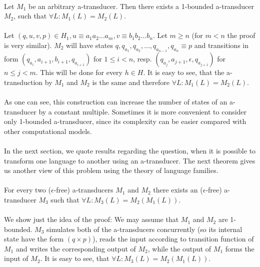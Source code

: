 \paragraph{}
\clema Let $M_{1}$ be an arbitrary a-transducer. Then there exists a 1-bounded a-transducer $M_{2}$, such that $\forall L: M_{1}(L) = M_{2}(L)$.

\paragraph{}
\dokaz Let $(q, u, v, p) \in H_{1}, u \equiv a_{1}a_{2}...a_{m}, v \equiv b_{1}b_{2}...b_{n}$. Let $m\geq n$ (for $m < n$ the proof is very similar). $M_{2}$ will have states $q, q_{a_{1}}, q_{a_{2}}, ..., q_{a_{n-1}}, q_{a_{n}} \equiv p$ and transitions in form $(q_{a_{i}}, a_{i+1}, b_{i+1}, q_{a_{i+1}})$ for $1 \leq i<n$, resp. $(q_{a_{j}}, a_{j+1}, \epsilon, q_{a_{j+1}})$ for $n \leq j < m$. This will be done for every $h \in H$. It is easy to see, that the a-transduction by $M_{1}$ and $M_{2}$ is the same and therefore $\forall L: M_{1}(L) = M_{2}(L)$. \square

\paragraph{}
As one can see, this construction can increase the number of states of an a-transducer by a constant multiple. Sometimes it is more convenient to consider only 1-bounded a-transducer, since its complexity can be easier compared with other computational models.

\paragraph{}
In the next section, we quote results regarding the question, when it is possible to transform one language to another using an a-transducer. The next theorem gives us another view of this problem using the theory of language families.

\paragraph{}
\clema For every two ($\epsilon $-free) a-transducers $M_{1}$ and $M_{2}$ there exists an ($\epsilon $-free) a-transducer $M_{3}$ such that $\forall L: M_{3}(L) = M_{2}(M_{1}(L))$.

\paragraph{}
\dokaz We show just the idea of the proof: We may assume that $M_{1}$ and $M_{2}$ are 1-bounded. $M_{3}$ simulates both of the a-transducers concurrently (so its internal state have the form $(q \times p)$), reads the input according to transition function of $M_{1}$ and writes the corresponding output of $M_{2}$, while the output of $M_{1}$ forms the input of $M_{2}$. It is easy to see, that $\forall L: M_{3}(L) = M_{2}(M_{1}(L))$. \square

